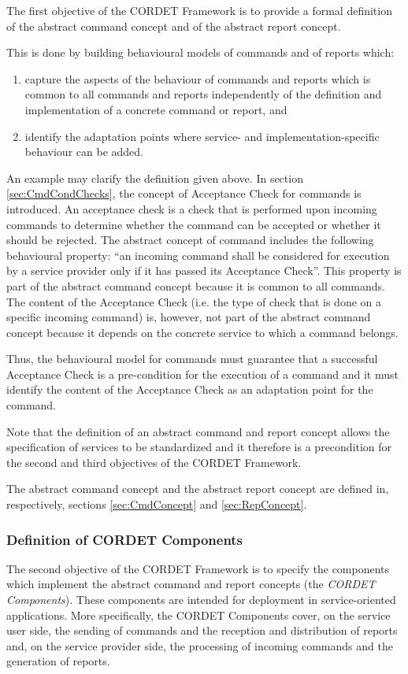 \documentclass{pnp_article}
\begin{document}
The first objective of the CORDET Framework is to provide a formal definition of the abstract command concept and of the abstract report concept. 

This is done by building behavioural models of commands and of reports which:

\begin{enumerate}
\item{} capture the aspects of the behaviour of commands and reports which is common to all commands and reports independently of the definition and implementation of a concrete command or report, and
\item{} identify the adaptation points where service- and implementation-specific behaviour can be added.
\end{enumerate}

An example may clarify the definition given above. 
In section \ref{sec:CmdCondChecks}, the concept of Acceptance Check for commands is introduced. 
An acceptance check is a check that is performed upon incoming commands to determine whether the command can be accepted or whether it should be rejected. 
The abstract concept of command includes the following behavioural property: “an incoming command shall be considered for execution by a service provider only if it has passed its Acceptance Check”. 
This property is part of the abstract command concept because it is common to all commands. 
The content of the Acceptance Check (i.e. the type of check that is done on a specific incoming command) is, however, not part of the abstract command concept because it depends on the concrete service to which a command belongs.

Thus, the behavioural model for commands must guarantee that a successful Acceptance Check is a pre-condition for the execution of a command and it must identify the content of the Acceptance Check as an adaptation point for the command.

Note that the definition of an abstract command and report concept allows the specification of services to be standardized and it therefore is a precondition for the second and third objectives of the CORDET Framework. 

The abstract command concept and the abstract report concept are defined in, respectively, sections \ref{sec:CmdConcept} and \ref{sec:RepConcept}.


\subsubsection{Definition of CORDET Components}\label{sec:DefCrCmp}
The second objective of the CORDET Framework is to specify the components which implement the abstract command and report concepts (the \textit{CORDET Components}). 
These components are intended for deployment in service-oriented applications. 
More specifically, the CORDET Components cover, on the service user side, the sending of commands and the reception and distribution of reports and, on the service provider side, the processing of incoming commands and the generation of reports.
\end{document}
